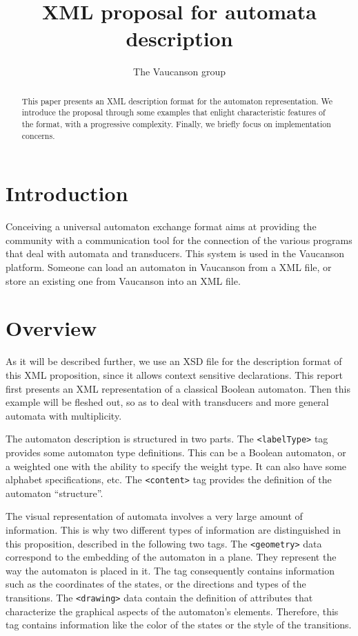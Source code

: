 \documentclass[a4paper]{article}
\newcommand{\Vauc}{{\sc Vaucanson}\xspace}
\newcommand{\xtag}[1]{\texttt{<#1>}}
\def\typetag{\xtag{labelType}}
\def\contenttag{\xtag{content}}
\def\geometrytag{\xtag{geometry}}
\def\drawingtag{\xtag{drawing}}
\begin{document}
\title{XML proposal for automata description}

\author{The \Vauc group}

\maketitle{}

\begin{abstract}
This paper presents an XML description format for the automaton
representation. We introduce the proposal through some examples that
enlight characteristic features of the format, with a progressive
complexity. Finally, we briefly focus on implementation concerns.
\end{abstract}

\section*{Introduction}

Conceiving a universal automaton exchange format aims at providing the
community with a communication tool for the connection
of the various programs that deal with automata and transducers.  This
system is used in the Vaucanson platform. Someone can load an
automaton in Vaucanson from a XML file, or store an existing one from
Vaucanson into an XML file.

\section{Overview}

As it will be described further, we use an XSD file \cite{XSD}
for the description format of this XML proposition, since it allows
context sensitive declarations.  This report first presents an XML
representation of a classical Boolean automaton. Then this example
will be fleshed out, so as to deal with transducers
and more general automata with multiplicity.

The automaton description is structured in two parts.  The
\typetag{} tag provides some automaton type definitions. This can be a
Boolean automaton, or a weighted one with the ability to specify the
weight type.  It can also have some alphabet specifications, etc. The
\contenttag{} tag provides the definition of the automaton
``structure''.

The visual representation of automata involves a very large amount of
information. This is why two different types of information are
distinguished in this proposition, described in the following
two tags.  The \geometrytag{} data correspond to the embedding
of the automaton in a plane. They represent the way the automaton is
placed in it. The tag consequently contains information such as the
coordinates of the states, or the directions and types of the
transitions. The \drawingtag{} data contain the definition of
attributes that characterize the graphical aspects of the automaton's
elements. Therefore, this tag contains information like the color of
the states or the style of the transitions.
\end{document}
